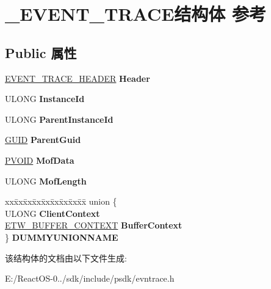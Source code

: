 \hypertarget{struct___e_v_e_n_t___t_r_a_c_e}{}\section{\+\_\+\+E\+V\+E\+N\+T\+\_\+\+T\+R\+A\+C\+E结构体 参考}
\label{struct___e_v_e_n_t___t_r_a_c_e}
\subsection*{Public 属性}
\begin{DoxyCompactItemize}
\item 
\mbox{\label{struct___e_v_e_n_t___t_r_a_c_e_a363cee4c867c645a8ae7991689dca91c}} 
\hyperlink{struct___e_v_e_n_t___t_r_a_c_e___h_e_a_d_e_r}{E\+V\+E\+N\+T\+\_\+\+T\+R\+A\+C\+E\+\_\+\+H\+E\+A\+D\+ER} {\bfseries Header}
\item 
\mbox{\label{struct___e_v_e_n_t___t_r_a_c_e_a173835e98828f611bbf37d0302773171}} 
U\+L\+O\+NG {\bfseries Instance\+Id}
\item 
\mbox{\label{struct___e_v_e_n_t___t_r_a_c_e_ac830a870ac6a759e224c6f54192686dc}} 
U\+L\+O\+NG {\bfseries Parent\+Instance\+Id}
\item 
\mbox{\label{struct___e_v_e_n_t___t_r_a_c_e_a6c911c6188d99b3f290fc1c47d8ea768}} 
\hyperlink{interface_g_u_i_d}{G\+U\+ID} {\bfseries Parent\+Guid}
\item 
\mbox{\label{struct___e_v_e_n_t___t_r_a_c_e_a675cf4607fa790d7d381b24876528d98}} 
\hyperlink{interfacevoid}{P\+V\+O\+ID} {\bfseries Mof\+Data}
\item 
\mbox{\label{struct___e_v_e_n_t___t_r_a_c_e_a19b79d6ef1d51c500f9ae24f966a2254}} 
U\+L\+O\+NG {\bfseries Mof\+Length}
\item 
\mbox{\label{struct___e_v_e_n_t___t_r_a_c_e_aa17f0eabeb2c4c5f4d15125e8919bc8a}} 
\begin{tabbing}
xx\=xx\=xx\=xx\=xx\=xx\=xx\=xx\=xx\=\kill
union \{\\
\>ULONG {\bfseries ClientContext}\\
\>\hyperlink{struct___e_t_w___b_u_f_f_e_r___c_o_n_t_e_x_t}{ETW\_BUFFER\_CONTEXT} {\bfseries BufferContext}\\
\} {\bfseries DUMMYUNIONNAME}\\

\end{tabbing}\end{DoxyCompactItemize}


该结构体的文档由以下文件生成\+:\begin{DoxyCompactItemize}
\item 
E\+:/\+React\+O\+S-\/0../sdk/include/psdk/evntrace.\+h\end{DoxyCompactItemize}
